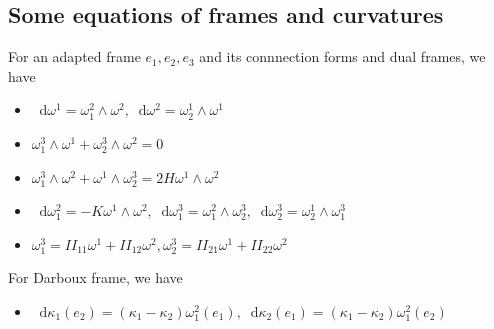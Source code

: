 \documentclass[a4paper,12pt]{article}
\renewcommand{\d}{\mathop{}\!\mathrm{d}}
\begin{document}
\subsection{Some equations of frames and curvatures}
For an adapted frame $e_1,e_2,e_3$ and its connnection forms and dual frames, we have
\begin{itemize}
    \item $\d\omega^1=\omega_1^2\wedge\omega^2,\d\omega^2=\omega_2^1\wedge\omega^1$
    \item $\omega_1^3\wedge\omega^1+\omega_2^3\wedge\omega^2=0$
    \item $\omega_1^3\wedge\omega^2+\omega^1\wedge\omega_2^3=2H\omega^1\wedge\omega^2$
    \item $\d\omega_1^2=-K\omega^1\wedge\omega^2,\d\omega_1^3=\omega_1^2\wedge\omega_2^3,\d\omega_2^3=\omega_2^1\wedge\omega_1^3$
    \item $\omega_1^3=II_{11}\omega^1+II_{12}\omega^2,\omega_2^3=II_{21}\omega^1+II_{22}\omega^2$
\end{itemize}\par
For Darboux frame, we have
\begin{itemize}
    \item $\d\kappa_1(e_2)=(\kappa_1-\kappa_2)\omega_1^2(e_1),\d\kappa_2(e_1)=(\kappa_1-\kappa_2)\omega_1^2(e_2)$
\end{itemize}
\end{document}
